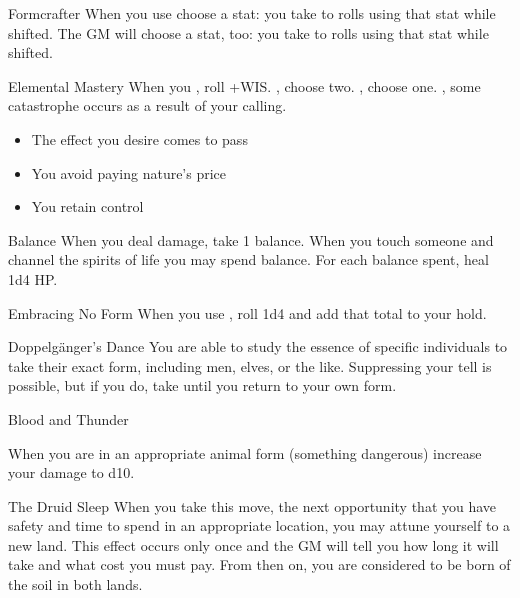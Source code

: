 \documentclass[8pt]{extarticle}
\begin{document}
\begin{multicols}{2}
\begin{amove}{Formcrafter}
  When you use  choose a stat: you take
   to rolls using that stat while shifted. The GM will
  choose a stat, too: you take  to rolls using that stat
  while shifted.
\end{amove}

\begin{amove}{Elemental Mastery}
  When you , roll +WIS. \onSuccess, choose
  two. \onPartial, choose one. \onMiss, some catastrophe occurs as a
  result of your calling.

  \begin{itemize}
  \item The effect you desire comes to pass
  \item You avoid paying nature’s price
  \item You retain control
  \end{itemize}
\end{amove}

\begin{amove}{Balance}
  When you deal damage, take 1 balance. When you touch someone and
  channel the spirits of life you may spend balance. For each balance
  spent, heal 1d4 HP.
\end{amove}


\vfill\null
\columnbreak

\secondAdvances

\begin{amove}{Embracing No Form}
  When you use , roll 1d4 and add that total to your hold.
\end{amove}


\begin{amove}{Doppelgänger’s Dance}
  You are able to study the essence of specific individuals to take
  their exact form, including men, elves, or the like. Suppressing
  your tell is possible, but if you do, take  until you
  return to your own form.
\end{amove}

\begin{amove}{Blood and Thunder}

  When you are in an appropriate animal form (something dangerous)
  increase your damage to d10.
\end{amove}

\begin{amove}{The Druid Sleep}
  When you take this move, the next opportunity that you have safety
  and time to spend in an appropriate location, you may attune
  yourself to a new land. This effect occurs only once and the GM will
  tell you how long it will take and what cost you must pay. From then
  on, you are considered to be born of the soil in both lands.
\end{amove}


\end{multicols}
\end{document}
